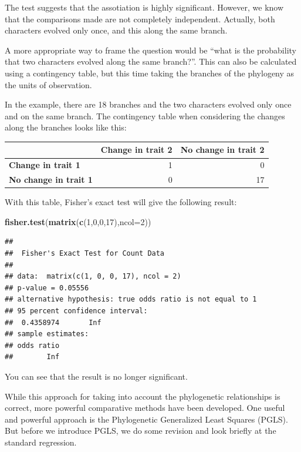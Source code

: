 \documentclass[
]{book}
\newenvironment{Shaded}{\begin{snugshade}}{\end{snugshade}}
\newcommand{\AttributeTok}[1]{\textcolor[rgb]{0.13,0.29,0.53}{#1}}
\newcommand{\DecValTok}[1]{\textcolor[rgb]{0.00,0.00,0.81}{#1}}
\newcommand{\FunctionTok}[1]{\textcolor[rgb]{0.13,0.29,0.53}{\textbf{#1}}}
\newcommand{\NormalTok}[1]{#1}
\begin{document}
The test suggests that the assotiation is highly significant. However, we know that the comparisons made are not completely independent. Actually, both characters evolved only once, and this along the same branch.

A more appropriate way to frame the question would be ``what is the probability that two characters evolved along the same branch?''. This can also be calculated using a contingency table, but this time taking the branches of the phylogeny as the units of observation.

In the example, there are 18 branches and the two characters evolved only once and on the same branch. The contingency table when considering the changes along the branches looks like this:

\begin{tabular}{>{}l|r|r}
\hline
  & Change in trait 2 & No change in trait 2\\
\hline
\textbf{Change in trait 1} & 1 & 0\\
\hline
\textbf{No change in trait 1} & 0 & 17\\
\hline
\end{tabular}

With this table, Fisher's exact test will give the following result:

\begin{Shaded}
\begin{Highlighting}[]
\FunctionTok{fisher.test}\NormalTok{(}\FunctionTok{matrix}\NormalTok{(}\FunctionTok{c}\NormalTok{(}\DecValTok{1}\NormalTok{,}\DecValTok{0}\NormalTok{,}\DecValTok{0}\NormalTok{,}\DecValTok{17}\NormalTok{),}\AttributeTok{ncol=}\DecValTok{2}\NormalTok{))}
\end{Highlighting}
\end{Shaded}

\begin{verbatim}
## 
##  Fisher's Exact Test for Count Data
## 
## data:  matrix(c(1, 0, 0, 17), ncol = 2)
## p-value = 0.05556
## alternative hypothesis: true odds ratio is not equal to 1
## 95 percent confidence interval:
##  0.4358974       Inf
## sample estimates:
## odds ratio 
##        Inf
\end{verbatim}

You can see that the result is no longer significant.

While this approach for taking into account the phylogenetic relationships is correct, more powerful comparative methods have been developed. One useful and powerful approach is the Phylogenetic Generalized Least Squares (PGLS). But before we introduce PGLS, we do some revision and look briefly at the standard regression.
\end{document}
